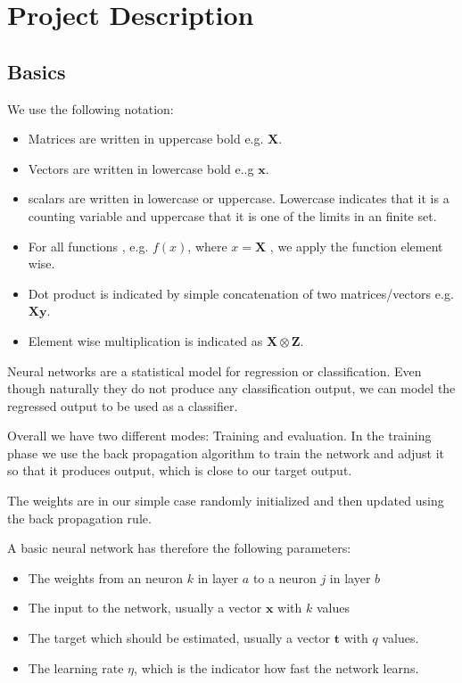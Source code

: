 \chapter{Project Description}

\section{Basics}

We use the following notation:
\begin{itemize}
\item Matrices are written in uppercase bold e.g. $\mathbf{X}$.
\item Vectors are written in lowercase bold e..g $\mathbf{x}$.
\item scalars are written in lowercase or uppercase. Lowercase indicates that it is a counting variable and uppercase that it is one of the limits in an finite set.
\item For all functions , e.g. $f(x)$, where $x = \mathbf{X}$ , we apply the function element wise.
\item Dot product is indicated by simple concatenation of two matrices/vectors e.g. $\mathbf{X} \mathbf{y}$.
\item Element wise multiplication is indicated as $\mathbf{X} \otimes \mathbf{Z}$.
\end{itemize}

Neural networks are a statistical model for regression or classification. Even though naturally they do not produce any classification output, we can model the regressed output to be used as a classifier. 

Overall we have two different modes: Training and evaluation. In the training phase we use the back propagation algorithm to train the network and adjust it so that it produces output, which is close to our target output.

The weights are in our simple case randomly initialized and then updated using the back propagation rule.

A basic neural network has therefore the following parameters:
\begin{itemize}
\item The weights from an neuron $k$ in layer $a$ to a neuron $j$ in layer $b$
\item The input to the network, usually a vector $\mathbf{x}$ with $k$ values
\item The target which should be estimated, usually a vector $\mathbf{t}$ with $q$ values.
\item The learning rate $\eta$, which is the indicator how fast the network learns.
\end{itemize}

